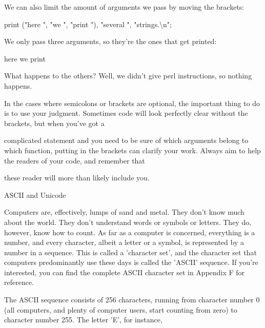 \documentclass[a4paper,11pt]{book}
\begin{document}
\noindent 

\noindent 

\noindent We can also limit the amount of arguments we pass by moving the brackets:

\noindent 

\noindent 

\noindent print ("here ", "we ", "print "), "several ", "strings.\textbackslash n";

\noindent 

\noindent We only pass three arguments, so they're the ones that get printed:

\noindent 

\noindent here we print

\noindent 

\noindent What  happens to  the others?  Well,  we  didn't  give  perl  instructions,  so  nothing  happens.

\noindent 

\noindent In the cases where semicolons or brackets are optional, the important thing to do is to use your judgment. Sometimes code will look perfectly clear without the brackets, but when you've got a

\noindent complicated statement and you need to be sure of which arguments belong to which function, putting in the brackets can clarify your work. Always aim to help the readers of your code, and remember that

\noindent these reader will more than likely include you.

\noindent 

\noindent 

\noindent ASCII and Unicode

\noindent 

\noindent Computers are, effectively, lumps of sand and metal. They don't know much about the world. They don't understand words or symbols or letters. They do, however, know how to count. As far as a computer is concerned, everything is a number, and every character, albeit a letter or a symbol, is represented by a number in a sequence. This is called a 'character set', and the character set that computers predominantly use these days is called the 'ASCII' sequence. If you're interested, you can find the complete ASCII character set in Appendix F for reference.

\noindent 

\noindent The ASCII sequence consists of 256 characters, running from character number 0 (all computers, and plenty of computer users, start counting from zero) to character number 255. The letter 'E', for instance,
\end{document}
